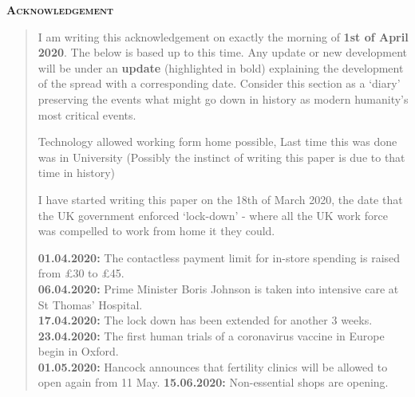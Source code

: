 \documentclass[fontsize=17pt]{article}
\begin{document}
\newpage
\begin{abstract}
In this paper we are going to explain the approaches for the mathematical modelling of the spread of infectious diseases such as Coronavirus (COVD-19, SARS-CoV-2). This paper will explain the classic compartmental models in the epidemics literature such as SIR, SIS, SEIR etc. It also explains key concepts such as the \textit{reproduction number}, the \textit{final size equation}, and the key theorems that are implied by these concepts.
\end{abstract}
\renewenvironment{abstract}
{
	\centerline
	{\large \bfseries \scshape Acknowledgement}
	\begin{quote}
	}
	{
	\end{quote}
}
\begin{abstract}
I am writing this acknowledgement on exactly the morning of \textbf{1st of April 2020}. The below is based up to this time.
Any update or new development will be under an \textbf{update} (highlighted in bold) explaining the development of the spread with a corresponding date. Consider this section as a `diary' preserving the events what might go down in history as modern humanity's most critical events. 

Technology allowed working form home possible, Last time this was done was in University (Possibly the instinct of writing this paper is due to that time in history)

I have started writing this paper on the 18th of March 2020, the date that the UK government enforced `lock-down' - where all the UK work force was compelled to work from home it they could.

\textbf{01.04.2020: }The contactless payment limit for in-store spending is raised from £30 to £45.\\
\textbf{06.04.2020: }Prime Minister Boris Johnson is taken into intensive care at St Thomas' Hospital.\\
\textbf{17.04.2020: }The lock down has been extended for another 3 weeks.\\
\textbf{23.04.2020: }The first human trials of a coronavirus vaccine in Europe begin in Oxford.\\
\textbf{01.05.2020: }Hancock announces that fertility clinics will be allowed to open again from 11 May.
\textbf{15.06.2020: }Non-essential shops are opening.\\

\end{abstract}
\end{document}
